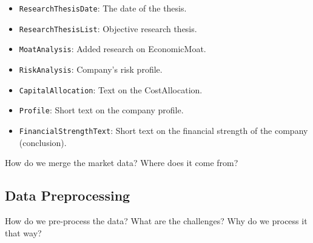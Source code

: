 \documentclass[conference]{IEEEtran}
\begin{document}
\begin{itemize}
  \item \texttt{ResearchThesisDate}: The date of the thesis.
  \item \texttt{ResearchThesisList}: Objective research thesis.
  \item \texttt{MoatAnalysis}: Added research on EconomicMoat.
  \item \texttt{RiskAnalysis}: Company's risk profile. 
  \item \texttt{CapitalAllocation}: Text on the CostAllocation. 
  \item \texttt{Profile}: Short text on the company profile.
  \item \texttt{FinancialStrengthText}: Short text on the financial strength of the company (conclusion).
\end{itemize}

How do we merge the market data? Where does it come from?
\subsection{Data Preprocessing}%
How do we pre-process the data? What are the challenges?
Why do we process it that way?
\end{document}
